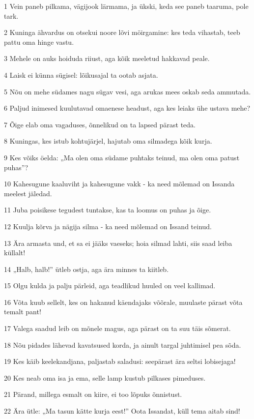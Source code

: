 \par 1 Vein paneb pilkama, vägijook lärmama, ja ükski, keda see paneb taaruma, pole tark.
\par 2 Kuninga ähvardus on otsekui noore lõvi möirgamine: kes teda vihastab, teeb pattu oma hinge vastu.
\par 3 Mehele on auks hoiduda riiust, aga kõik meeletud hakkavad peale.
\par 4 Laisk ei künna sügisel: lõikusajal ta ootab asjata.
\par 5 Nõu on mehe südames nagu sügav vesi, aga arukas mees oskab seda ammutada.
\par 6 Paljud inimesed kuulutavad omaenese headust, aga kes leiaks ühe ustava mehe?
\par 7 Õige elab oma vagaduses, õnnelikud on ta lapsed pärast teda.
\par 8 Kuningas, kes istub kohtujärjel, hajutab oma silmadega kõik kurja.
\par 9 Kes võiks öelda: „Ma olen oma südame puhtaks teinud, ma olen oma patust puhas”?
\par 10 Kahesugune kaaluviht ja kahesugune vakk - ka need mõlemad on Issanda meelest jäledad.
\par 11 Juba poisikese tegudest tuntakse, kas ta loomus on puhas ja õige.
\par 12 Kuulja kõrva ja nägija silma - ka need mõlemad on Issand teinud.
\par 13 Ära armasta und, et sa ei jääks vaeseks; hoia silmad lahti, siis saad leiba küllalt!
\par 14 „Halb, halb!” ütleb ostja, aga ära minnes ta kiitleb.
\par 15 Olgu kulda ja palju pärleid, aga teadlikud huuled on veel kallimad.
\par 16 Võta kuub sellelt, kes on hakanud käendajaks võõrale, muulaste pärast võta temalt pant!
\par 17 Valega saadud leib on mõnele magus, aga pärast on ta suu täis sõmerat.
\par 18 Nõu pidades lähevad kavatsused korda, ja ainult targal juhtimisel pea sõda.
\par 19 Kes käib keelekandjana, paljastab saladusi: seepärast ära seltsi lobisejaga!
\par 20 Kes neab oma isa ja ema, selle lamp kustub pilkases pimeduses.
\par 21 Pärand, millega esmalt on kiire, ei too lõpuks õnnistust.
\par 22 Ära ütle: „Ma tasun kätte kurja eest!” Oota Issandat, küll tema aitab sind!
